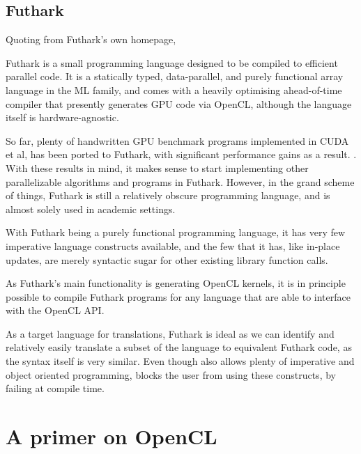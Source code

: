 \subsection*{Futhark}
Quoting from Futhark's own homepage,
\begin{formal}
  Futhark is a small programming language designed to be compiled to efficient parallel code. It is a statically typed, data-parallel, and purely functional array language in the ML family, and comes with a heavily optimising ahead-of-time compiler that presently generates GPU code via OpenCL, although the language itself is hardware-agnostic.
\end{formal}
So far, plenty of handwritten GPU benchmark programs implemented in CUDA et al,
has been ported to Futhark, with significant performance gains as a result.
\cite{citesomething}. With these results in mind, it makes sense to start
implementing other parallelizable algorithms and programs in Futhark. However,
in the grand scheme of things, Futhark is still a relatively obscure programming
language, and is almost solely used in academic settings.

With Futhark being a purely functional programming language, it has very few
imperative language constructs available, and the few that it has, like
in-place updates, are merely syntactic sugar for other existing library function calls.

As Futhark's main functionality is generating OpenCL kernels, it is in principle
possible to compile Futhark programs for any language that are able to interface
with the OpenCL API.

As a target language for \fsharp{} translations,
Futhark is ideal as we can identify and relatively easily translate a subset
of the \fsharp{} language to equivalent Futhark code, as the syntax itself is
very similar. Even though \fsharp{} also allows plenty of imperative and object
oriented programming,
\fshark{} blocks the user from using these constructs, by failing at \fshark{}
compile time.


\section*{A primer on OpenCL}


